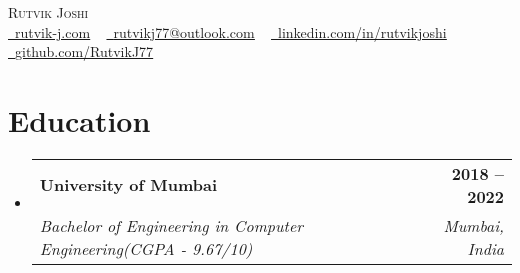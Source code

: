 \documentclass[letterpaper,11pt]{article}
\makeatletter
\newcommand{\resumeSubheading}[4]{
  \vspace{-2pt}\item
    \begin{tabular*}{1.0\textwidth}[t]{l@{\extracolsep{\fill}}r}
      \textbf{#1} & \textbf{\small #2} \\
      \textit{\small#3} & \textit{\small #4} \\
    \end{tabular*}\vspace{-7pt}
}
\newcommand{\resumeSubHeadingListStart}{\begin{itemize}[leftmargin=0.0in, label={}]}
\newcommand{\resumeSubHeadingListEnd}{\end{itemize}}
\makeatother
\begin{document}

\begin{center}
    {\Huge \scshape Rutvik Joshi} \\ \vspace{1pt}
    \faGlobe \href{https://rutvik-j.github.io/home}{\raisebox{-0.1\height}\ \underline{rutvik-j.com}} ~
    \faEnvelope \href{mailto:rutvikj77@outlook.com}{\raisebox{-0.2\height}\  \underline{rutvikj77@outlook.com}} ~ 
    \faLinkedin \href{https://linkedin.com/in/rutvikjoshi/}{\raisebox{-0.2\height}\ \underline{linkedin.com/in/rutvikjoshi}}  ~
    \faGithub \href{https://github.com/RutvikJ77}{\raisebox{-0.2\height}\ \underline{github.com/RutvikJ77}}
    \vspace{-8pt}
\end{center}


\section{Education}
  \resumeSubHeadingListStart
    \resumeSubheading
      {University of Mumbai}{2018 -- 2022}
      {Bachelor of Engineering in Computer Engineering(CGPA - 9.67/10)}{Mumbai, India}
  \resumeSubHeadingListEnd

\end{document}
